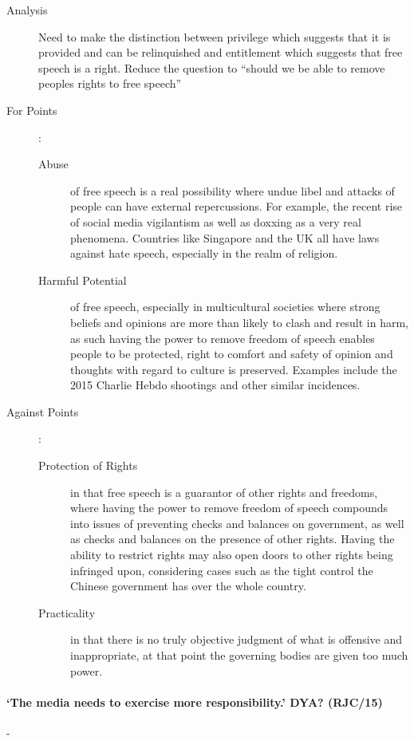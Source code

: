 \documentclass[../../main]{subfiles}
\begin{document}
\begin{description}
	\item[Analysis] Need to make the distinction between privilege which suggests that it is provided and can be relinquished and entitlement which suggests that free speech is a right. Reduce the question to ``should we be able to remove peoples rights to free speech''
	\item[For Points] :
		\begin{description}
			\item[Abuse] of free speech is a real possibility where undue libel and attacks of people can have external repercussions. For example, the recent rise of social media vigilantism as well as doxxing as a very real phenomena. Countries like Singapore and the UK all have laws against hate speech, especially in the realm of religion.
			\item[Harmful Potential] of free speech, especially in multicultural societies where strong beliefs and opinions are more than likely to clash and result in harm, as such having the power to remove freedom of speech enables people to be protected, right to comfort and safety of opinion and thoughts with regard to culture is preserved. Examples include the 2015 Charlie Hebdo shootings and other similar incidences.
		\end{description}
	\item[Against Points] :
		\begin{description}
			\item[Protection of Rights] in that free speech is a guarantor of other rights and freedoms, where having the power to remove freedom of speech compounds into issues of preventing checks and balances on government, as well as checks and balances on the presence of other rights. Having the ability to restrict rights may also open doors to other rights being infringed upon, considering cases such as the tight control the Chinese government has over the whole country.
			\item[Practicality] in that there is no truly objective judgment of what is offensive and inappropriate, at that point the governing bodies are given too much power. 
		\end{description}
\end{description}

\paragraph{`The media needs to exercise more responsibility.' DYA? (RJC/15)}-
\end{document}
